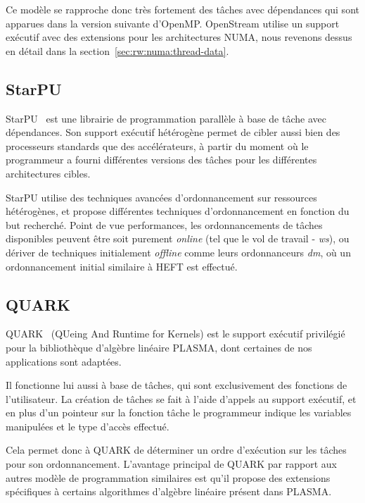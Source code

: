 Ce modèle se rapproche donc très fortement des tâches avec dépendances qui sont apparues dans la version suivante d'OpenMP.
OpenStream utilise un support exécutif avec des extensions pour les architectures NUMA, nous revenons dessus en détail dans la section~\ref{sec:rw:numa:thread-data}.

\subsection{StarPU}

StarPU~\cite{StarPU} est une librairie de programmation parallèle à base de tâche avec dépendances.
Son support exécutif hétérogène permet de cibler aussi bien des processeurs standards que des accélérateurs, à partir du moment où le programmeur a fourni différentes versions des tâches pour les différentes architectures cibles.

StarPU utilise des techniques avancées d'ordonnancement sur ressources hétérogènes, et propose différentes techniques d'ordonnancement en fonction du but recherché.
Point de vue performances, les ordonnancements de tâches disponibles peuvent être soit purement \emph{online} (tel que le vol de travail - \emph{ws}), ou dériver de techniques initialement \emph{offline} comme leurs ordonnanceurs \emph{dm}, où un ordonnancement initial similaire à HEFT est effectué.

\subsection{QUARK}

QUARK~\cite{Kurzak2013} (QUeing And Runtime for Kernels) est le support exécutif privilégié pour la bibliothèque d'algèbre linéaire PLASMA, dont certaines de nos applications sont adaptées.

Il fonctionne lui aussi à base de tâches, qui sont exclusivement des fonctions de l'utilisateur.
La création de tâches se fait à l'aide d'appels au support exécutif, et en plus d'un pointeur sur la fonction tâche le programmeur indique les variables manipulées et le type d'accès effectué.

Cela permet donc à QUARK de déterminer un ordre d'exécution sur les tâches pour son ordonnancement.
L'avantage principal de QUARK par rapport aux autres modèle de programmation similaires est qu'il propose des extensions spécifiques à certains algorithmes d'algèbre linéaire présent dans PLASMA.


